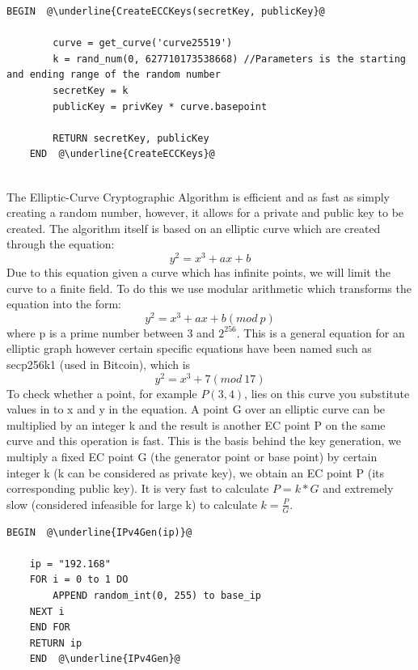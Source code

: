 \documentclass[a4paper, titlepage]{article}
\begin{document}
\begin{lstlisting}[caption=Elliptic-Curve Cryptographic (ECC) Key Generation, escapechar=\@]
	BEGIN  @\underline{CreateECCKeys(secretKey, publicKey}@

		curve = get_curve('curve25519')
		k = rand_num(0, 627710173538668) //Parameters is the starting and ending range of the random number
		secretKey = k
		publicKey = privKey * curve.basepoint 

		RETURN secretKey, publicKey
	END  @\underline{CreateECCKeys}@
			
\end{lstlisting}
The Elliptic-Curve Cryptographic Algorithm is efficient and as fast as simply creating a random number, however, it allows for a private and public key to be created. The algorithm itself is based on an elliptic curve which are created through the equation: \[ y^2 = x^3 + ax + b \] Due to this equation given a curve which has infinite points, we will limit the curve to a finite field. To do this we use modular arithmetic which transforms the equation into the form: \[ y^2 = x^3 + ax + b(mod\ p)\] where p is a prime number between $3$ and $2^{256}$. This is a general equation for an elliptic graph however certain specific equations have been named such as secp256k1 (used in Bitcoin), which is \[y^2 = x^3 + 7 (mod\ 17) \] To check whether a point, for example $P(3,4)$, lies on this curve you substitute values in to x and y in the equation. A point G over an elliptic curve can be multiplied by an integer k and the result is another EC point P on the same curve and this operation is fast. This is the basis behind the key generation, we multiply a fixed EC point G (the generator point or base point) by certain integer k (k can be considered as private key), we obtain an EC point P (its corresponding public key). It is very fast to calculate $P = k * G$ and extremely slow (considered infeasible for large k) to calculate $k = \frac{P}{G}$.

\begin{lstlisting}[caption= IPv4 Creation, escapechar=\@]
	BEGIN  @\underline{IPv4Gen(ip)}@

	ip = "192.168"
	FOR i = 0 to 1 DO
		APPEND random_int(0, 255) to base_ip
	NEXT i
	END FOR
	RETURN ip	
	END  @\underline{IPv4Gen}@
\end{lstlisting}
\end{document}
